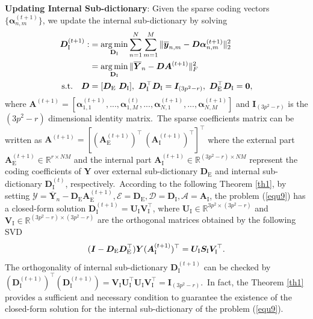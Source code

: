 \vspace{2mm}
\textbf{Updating Internal Sub-dictionary}: Given the sparse coding vectors $\{\bm{\alpha}_{n,m}^{(t+1)}\}$, we update the internal sub-dictionary by solving
\vspace{-2mm}
\begin{equation}\label{equ9}
\begin{split}
\bm{D}_{\text{I}}^{(t+1)}
:
&
=
\argmin_{\textbf{D}_{\text{I}}}
\sum_{n=1}^{N}\sum_{m=1}^{M}\|\bm{\overline{y}}_{n,m}-\bm{D}\bm{\alpha}_{n,m}^{(t+1)}\|_{2}^{2}
\\
&
=
\argmin_{\textbf{D}_{\text{I}}}
\|\bm{\overline{Y}}_{n}-\bm{D}\bm{A}^{(t+1)}\|_{F}^{2}
\\
\text{s.t.}
\quad
\bm{D}
&
=
[\bm{D}_{\text{E}}\ \bm{D}_{\text{I}}],\ \bm{D}_{\text{I}}^{\top}\bm{D}_{\text{I}} = \bm{I}_{(3p^2-r)},\ \bm{D}_{\text{E}}^{\top}\bm{D}_{\text{I}} = \bm{0},
\end{split}
\end{equation}
where $\textbf{A}^{(t+1)}=[\bm{\alpha}_{1,1}^{(t+1)},...,\bm{\alpha}_{1,M}^{(t)},...,\bm{\alpha}_{N,1}^{(t+1)},...,\bm{\alpha}_{N,M}^{(t+1)}]$ and $\bm{I}_{(3p^2-r)}$ is the $(3p^2-r)$ dimensional identity matrix.\ The sparse coefficients matrix can be written as $\bm{A}^{(t+1)}=[(\bm{A}_{\text{E}}^{(t+1)})^{\top}\ (\bm{A}_{\text{I}}^{(t+1)})^{\top}]^{\top}$ where the external part $\bm{A}_{\text{E}}^{(t+1)}\in\mathbb{R}^{r\times NM}$ and the internal part $\bm{A}_{\text{I}}^{(t+1)}\in\mathbb{R}^{(3p^2-r)\times NM}$ represent the coding coefficients of $\bm{Y}$ over external sub-dictionary $\bm{D}_{\text{E}}$ and internal sub-dictionary $\bm{D}_{\text{I}}^{(t)}$, respectively.\ According to the following Theorem \ref{th1}, by setting $\mathcal{Y}=\bm{\overline{Y}}_{n}-\bm{D}_{\text{E}}\bm{A}_{\text{E}}^{(t+1)},\mathcal{E}=\bm{D}_{\text{E}},\mathcal{D}=\bm{D}_{\text{I}},\mathcal{A}=\bm{A}_{\text{I}}$, the problem (\ref{equ9}) has a closed-form solution $\bm{D}_{\text{I}}^{(t+1)}=\bm{U}_{\text{I}}\bm{V}_{\text{I}}^{\top}$, where $\bm{U}_{\text{I}}\in\mathbb{R}^{3p^2\times (3p^2-r)}$ and $\bm{V}_{\text{I}}\in\mathbb{R}^{(3p^2-r)\times (3p^2-r)}$ are the orthogonal matrices obtained by the following SVD \cite{eckart1936approximation}
\vspace{-1mm}
\begin{equation}\label{equ10}
\vspace{-1mm}
(\bm{I}-\bm{D}_{\text{E}}\bm{D}_{\text{E}}^{\top})\bm{Y}(\bm{A}_{\text{I}}^{(t+1)})^{\top}
=
\bm{U}_{\text{I}}\bm{S}_{\text{I}}\bm{V}_{\text{I}}^{\top}.
\end{equation}
The orthogonality of internal sub-dictionary $\bm{D}_{\text{I}}^{(t+1)}$ can be checked by 
$(\bm{D}_{\text{I}}^{(t+1)})^{\top}(\bm{D}_{\text{I}}^{(t+1)})=\bm{V}_{\text{I}}\bm{U}_{\text{I}}^{\top}\bm{U}_{\text{I}}\bm{V}_{\text{I}}^{\top}=\bm{I}_{(3p^2-r)}$.\ In fact, the Theorem \ref{th1} provides a sufficient and necessary condition to guarantee the existence of the closed-form solution for the internal sub-dictionary of the problem (\ref{equ9}).

